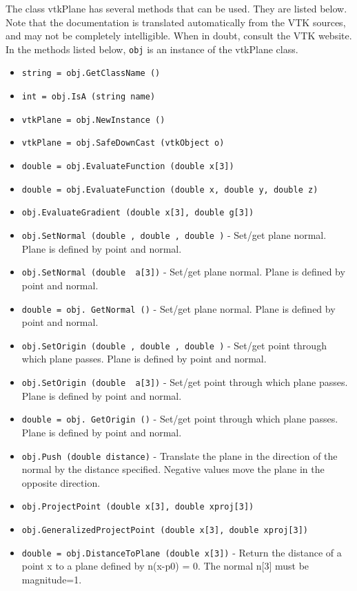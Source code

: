 The class vtkPlane has several methods that can be used.
  They are listed below.
Note that the documentation is translated automatically from the VTK sources,
and may not be completely intelligible.  When in doubt, consult the VTK website.
In the methods listed below, \verb|obj| is an instance of the vtkPlane class.
\begin{itemize}
\item  \verb|string = obj.GetClassName ()|

\item  \verb|int = obj.IsA (string name)|

\item  \verb|vtkPlane = obj.NewInstance ()|

\item  \verb|vtkPlane = obj.SafeDownCast (vtkObject o)|

\item  \verb|double = obj.EvaluateFunction (double x[3])|

\item  \verb|double = obj.EvaluateFunction (double x, double y, double z)|

\item  \verb|obj.EvaluateGradient (double x[3], double g[3])|

\item  \verb|obj.SetNormal (double , double , double )| -  Set/get plane normal. Plane is defined by point and normal.

\item  \verb|obj.SetNormal (double  a[3])| -  Set/get plane normal. Plane is defined by point and normal.

\item  \verb|double = obj. GetNormal ()| -  Set/get plane normal. Plane is defined by point and normal.

\item  \verb|obj.SetOrigin (double , double , double )| -  Set/get point through which plane passes. Plane is defined by point 
 and normal.

\item  \verb|obj.SetOrigin (double  a[3])| -  Set/get point through which plane passes. Plane is defined by point 
 and normal.

\item  \verb|double = obj. GetOrigin ()| -  Set/get point through which plane passes. Plane is defined by point 
 and normal.

\item  \verb|obj.Push (double distance)| -  Translate the plane in the direction of the normal by the
 distance specified.  Negative values move the plane in the
 opposite direction.

\item  \verb|obj.ProjectPoint (double x[3], double xproj[3])|

\item  \verb|obj.GeneralizedProjectPoint (double x[3], double xproj[3])|

\item  \verb|double = obj.DistanceToPlane (double x[3])| -  Return the distance of a point x to a plane defined by n(x-p0) = 0. The
 normal n[3] must be magnitude=1.

\end{itemize}
